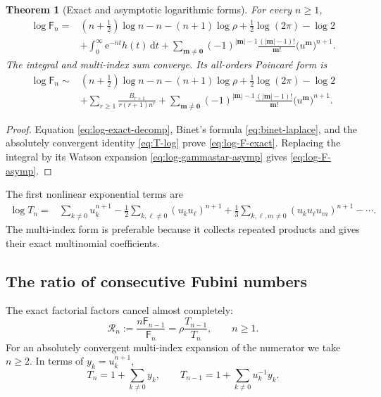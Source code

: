\documentclass[11pt,a4paper,oneside]{article}
\newtheorem{theorem}{Theorem}[section]
\theoremstyle{definition}
\theoremstyle{remark}
\newcommand{\Fub}{\mathsf{F}}
\newcommand{\e}{\mathrm{e}}
\newcommand{\dd}{\,\mathrm{d}}
\newcommand{\asympseries}{\mathrel{\sim}}
\begin{document}
\begin{theorem}[Exact and asymptotic logarithmic forms]\label{thm:log-F}
For every $n\ge1$,
\begin{align}
 \log\Fub_n
 ={}&(n+\tfrac12)\log n-n-(n+1)\log\rho
      +\tfrac12\log(2\pi)-\log2\nonumber\\
 &+\int_0^\infty \e^{-nt}h(t)\dd t
 +\sum_{\bm m\ne\bm0}(-1)^{|\bm m|-1}
       \frac{(|\bm m|-1)!}{\bm m!}
       \bigl(u^{\bm m}\bigr)^{n+1}.
 \label{eq:log-F-exact}
\end{align}
The integral and multi-index sum converge.  Its all-orders Poincar\'e form is
\begin{align}
 \log\Fub_n\asympseries{}&(n+\tfrac12)\log n-n-(n+1)\log\rho
      +\tfrac12\log(2\pi)-\log2\nonumber\\
 &+\sum_{r\ge1}\frac{B_{r+1}}{r(r+1)n^r}
 +\sum_{\bm m\ne\bm0}(-1)^{|\bm m|-1}
       \frac{(|\bm m|-1)!}{\bm m!}
       \bigl(u^{\bm m}\bigr)^{n+1}.
 \label{eq:log-F-asymp}
\end{align}
\end{theorem}

\begin{proof}
Equation \cref{eq:log-exact-decomp}, Binet's formula
\cref{eq:binet-laplace}, and the absolutely convergent identity
\cref{eq:T-log} prove \cref{eq:log-F-exact}.  Replacing the integral by its
Watson expansion \cref{eq:log-gammastar-asymp} gives
\cref{eq:log-F-asymp}.
\end{proof}

The first nonlinear exponential terms are
\begin{align*}
 \log T_n={}&
 \sum_{k\ne0}u_k^{n+1}
 -\frac12\sum_{k,\ell\ne0}(u_ku_\ell)^{n+1}
 +\frac13\sum_{k,\ell,m\ne0}(u_ku_\ell u_m)^{n+1}-\cdots.
\end{align*}
The multi-index form is preferable because it collects repeated products and
gives their exact multinomial coefficients.

\subsection{The ratio of consecutive Fubini numbers}
The exact factorial factors cancel almost completely:
\begin{equation}\label{eq:ratio-exact}
 \mathcal R_n:=\frac{n\Fub_{n-1}}{\Fub_n}
 =\rho\frac{T_{n-1}}{T_n},
 \qquad n\ge1.
\end{equation}
For an absolutely convergent multi-index expansion of the numerator we take
$n\ge2$.  In terms of $y_k=u_k^{n+1}$,
\[
 T_n=1+\sum_{k\ne0}y_k,
 \qquad
 T_{n-1}=1+\sum_{k\ne0}u_k^{-1}y_k.
\]
\end{document}
